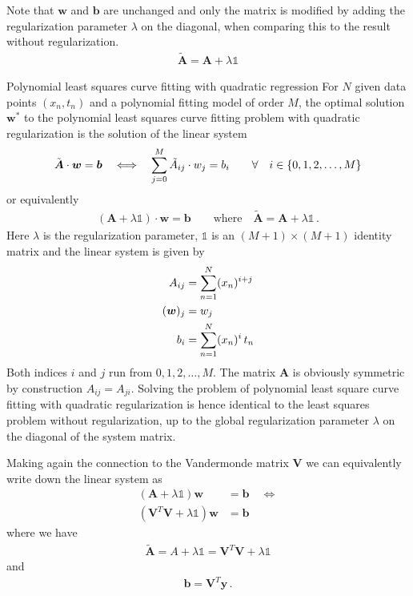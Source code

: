 \documentclass[11pt, DINA4, fleqn]{amsart}
\def\vw{\boldsymbol{w}\xspace}
\def\vb{\boldsymbol{b}\xspace}
\def\vy{\boldsymbol{y}\xspace}
\def\mA{\boldsymbol{A}\xspace}
\def\mV{\boldsymbol{V}\xspace}
\begin{document}
Note that $\vw$ and $\vb$ are unchanged and only the matrix is modified by adding the regularization parameter $\lambda$ on the diagonal, when comparing this to the result without regularization.
\begin{align}
\tilde{\mA} = \mA  + \lambda \mathds{1}
\end{align}

\begin{mybox_tc3}{Polynomial least squares curve fitting with quadratic regression}
	For $N$ given data points $(x_n, t_n)$ and a polynomial fitting model of order $M$,
	the optimal solution $\vw^*$ to the polynomial least squares curve fitting problem with quadratic regularization is the solution of the linear system
	\begin{align}
	\tilde{\mA} \cdot \vw = \vb \quad \Longleftrightarrow \quad \sum \displaylimits_{j = 0}^{M} \tilde{A}_{ij} \cdot w_j = b_i  \qquad \forall\quad i \in \{0, 1, 2, \dotsc, M\}
	\end{align}
	or equivalently
	\begin{align}
	(\mA + \lambda \mathds{1}) \cdot \vw = \vb \qquad \text{where} \quad \tilde{\mA} = \mA + \lambda \mathds{1} \, .
	\end{align}
	Here $\lambda$ is the regularization parameter, $\mathds{1}$ is an $(M+1) \times (M+1)$ identity matrix and the linear system is given by
	\begin{align}
	A_{ij} &= \sum \displaylimits_{n = 1}^{N} (x_n)^{i + j} \\
	(\vw)_j &= w_j \\
	b_i &= \sum \displaylimits_{n = 1}^{N} (x_n)^{i} \, t_n
	\end{align}
	Both indices $i$ and $j$ run from $0, 1, 2, \dotsc, M$.
	The matrix $\mA$ is obviously symmetric by construction $A_{ij} = A_{ji}$.
	Solving the problem of polynomial least square curve fitting with quadratic regularization is hence identical to the least squares problem without regularization, up to the global regularization parameter $\lambda$ on the diagonal of the system matrix. 
\end{mybox_tc3}

Making again the connection to the Vandermonde matrix $\mV$ we can equivalently write down the linear system as
\begin{align}
(\mA + \lambda \mathds{1}) \vw &=  \vb \quad \Longleftrightarrow \\
(\mV^T \mV + \lambda \mathds{1}) \vw &=  \vb
\end{align}
where we have
\begin{align}
\tilde{\mA} = A + \lambda \mathds{1} = \mV^T\mV + \lambda \mathds{1}
\end{align}
and
\begin{align}
\vb = \mV^T \vy \, .
\end{align}
\end{document}
